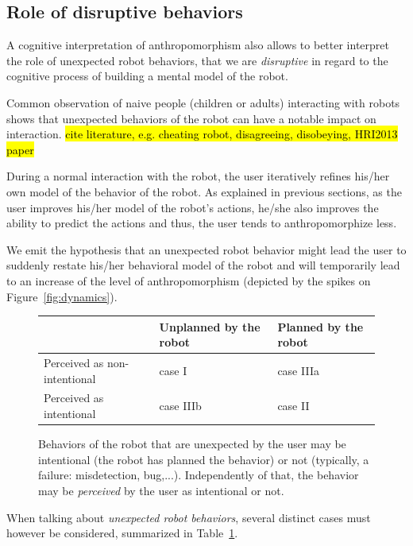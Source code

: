 \documentclass{frontiersSCNS} %
\begin{document}
\subsection{Role of disruptive behaviors}
\label{sec:disruptive}

A cognitive interpretation of anthropomorphism also allows to better interpret
the role of unexpected robot behaviors, that we are \emph{disruptive} in regard
to the cognitive process of building a mental model of the robot.

Common observation of naive people (children or adults) interacting with robots
shows that unexpected behaviors of the robot can have a notable impact on
interaction. \hl{cite literature, e.g. cheating robot, disagreeing, disobeying,
HRI2013 paper}

During a normal interaction with the robot, the user iteratively refines his/her
own model of the behavior of the robot. As explained in previous sections, as
the user improves his/her model of the robot's actions, he/she also improves the
ability to predict the actions and thus, the user tends to anthropomorphize
less.

We emit the hypothesis that an unexpected robot behavior might lead the user to
suddenly restate his/her behavioral model of the robot and will temporarily lead
to an increase of the level of anthropomorphism (depicted by the spikes on
Figure~\ref{fig:dynamics}).



\begin{figure}\footnotesize
    \centering
    \begin{tabular}{  >{\centering\arraybackslash}m{2cm} | >{\centering\arraybackslash}m{2cm} | >{\centering\arraybackslash}m{2cm} }
     & Unplanned by the robot & Planned by the robot \\ \hline
    Perceived as non-intentional & case I  & case IIIa  \\ \hline
    Perceived as intentional &  case IIIb & case II 
    \end{tabular}
\caption{
    Behaviors of the robot that are unexpected by the user may be intentional
    (the robot has planned the behavior) or not (typically, a failure:
    misdetection, bug,...). Independently of that, the behavior may be
    \emph{perceived} by the user as intentional or not.}
\label{fig:perceptionUnexpectedBehavior}
\end{figure}

When talking about \emph{unexpected robot behaviors}, several distinct cases
must however be considered, summarized in
Table~\ref{fig:perceptionUnexpectedBehavior}.
\end{document}
